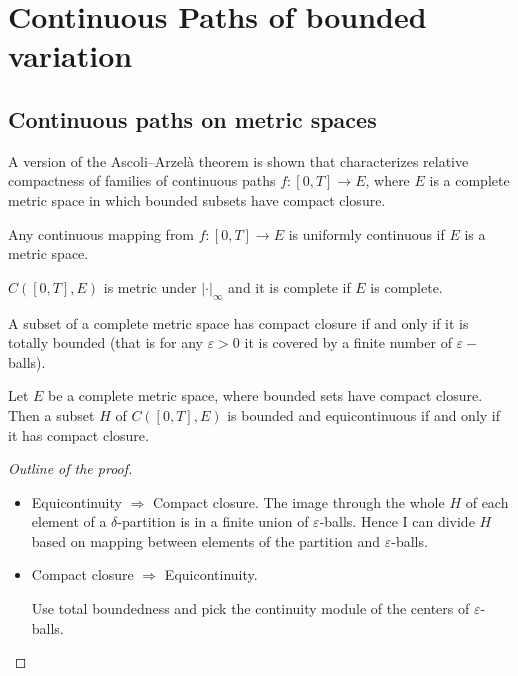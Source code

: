 \section{Continuous Paths of bounded variation}

\subsection{Continuous paths on metric spaces}

A version of the Ascoli–Arzelà theorem is shown that characterizes relative compactness of families of continuous paths \( f:[0,T] \to E \), where \( E \) is a complete metric space in which bounded subsets have compact closure.

\begin{lemma}
Any continuous mapping from $f:[0,T] \rightarrow E$ is uniformly continuous if $E$ is a metric space.
\end{lemma}

\begin{lemma}
    $C([0,T],E)$ is metric under $|\cdot|_{\infty}$ and it is complete if $E$ is complete.
\end{lemma}

\begin{lemma}
    A subset of a complete metric space has compact closure if and only if it is totally bounded (that is for any $\varepsilon > 0$ it is covered by a finite number of $\varepsilon-$balls).
\end{lemma}

\begin{theorem}
    Let $E$ be a complete metric space, where bounded sets have compact closure. Then a subset $H$ of $C([0,T],E)$ is bounded and equicontinuous if and only if it has compact closure.
\end{theorem}
\begin{proof}[Outline of the proof]
\begin{itemize}

\item Equicontinuity $\Rightarrow$ Compact closure.
The image through the whole $H$ of each element of a $\delta$-partition is in a finite union of $\varepsilon$-balls.
Hence I can divide $H$ based on mapping between elements of the partition and $\varepsilon$-balls.

\item Compact closure $\Rightarrow$ Equicontinuity.

Use total boundedness and pick the continuity module of the centers of $\varepsilon$-balls.
\end{itemize}
\end{proof}

